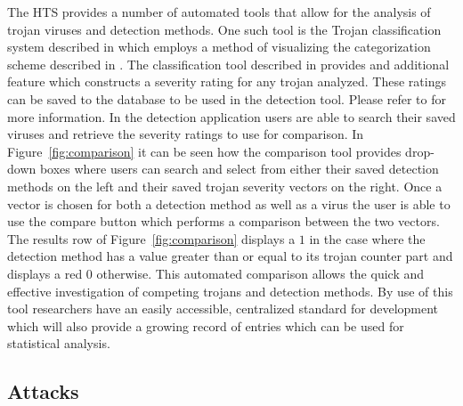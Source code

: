 The HTS provides a number of automated tools that allow for the analysis of trojan viruses and detection methods. One such tool is the Trojan classification system described in \cite{meCategorization} which employs a method of visualizing the categorization scheme described in \cite{SamerCategorization}. The classification tool described in \cite{meCategorization} provides and additional feature which constructs a severity rating for any trojan analyzed. These ratings can be saved to the database to be used in the detection tool. Please refer to \cite{meCategorization} for more information. In the detection application users are able to search their saved viruses and retrieve the severity ratings to use for comparison. In Figure~\ref{fig:comparison} it can be seen how the comparison tool provides drop-down boxes where users can search and select from either their saved detection methods on the left and their saved trojan severity vectors on the right. Once a vector is chosen for both a detection method as well as a virus the user is able to use the compare button which performs a comparison between the two vectors. The results row of Figure~\ref{fig:comparison} displays a $1$ in the case where the detection method has a value greater than or equal to its trojan counter part and displays a red $0$ otherwise. This automated comparison allows the quick and effective investigation of competing trojans and detection methods. By use of this tool researchers have an easily accessible, centralized standard for development which will also provide a growing record of entries which can be used for statistical analysis.
\subsection{Attacks} \label{Application:Attacks}



